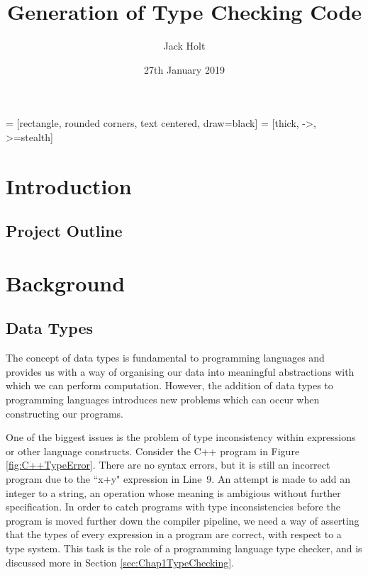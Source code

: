 \documentclass{UoYCSproject}
\title{Generation of Type Checking Code}
\author{Jack Holt}
\date{27th January 2019}
\begin{document}
 = [rectangle, rounded corners, text centered, draw=black]
 = [thick, ->, >=stealth]

\maketitle
\listoffigures
{}

\begin{summary}
\end{summary}

\chapter{Introduction}

\section{Project Outline}

\chapter{Background}

\section{Data Types}

The concept of data types is fundamental to programming languages and provides
us with a way of organising our data into meaningful abstractions with which we
can perform computation. However, the addition of data types to programming
languages introduces new problems which can occur when constructing our programs.

One of the biggest issues is the problem of type inconsistency within expressions
or other language constructs. Consider the C++ program in Figure \ref{fig:C++TypeError}.
There are no syntax errors, but it is still an incorrect program due to the
``x+y" expression in Line~9. An attempt is made to add an integer to a string,
an operation whose meaning is ambigious without further specification. In order
to catch programs with type inconsistencies before the program is moved further
down the compiler pipeline, we need a way of asserting that the types of every
expression in a program are correct, with respect to a type system. This task
is the role of a programming language type checker, and is discussed more in
Section \ref{sec:Chap1TypeChecking}.
\end{document}
